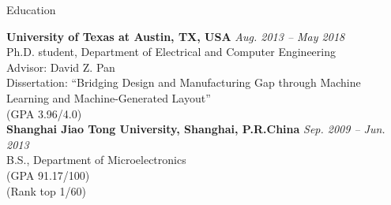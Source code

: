

\begin{rSection}{Education}


{\bf University of Texas at Austin, TX, USA} \hfill {\em Aug. 2013 -- May 2018} \\ 
Ph.D. student, Department of Electrical and Computer Engineering \\
Advisor: David Z. Pan \\
Dissertation: ``Bridging Design and Manufacturing Gap through Machine Learning and Machine-Generated Layout'' \\
(GPA 3.96/4.0) \\

{\bf Shanghai Jiao Tong University, Shanghai, P.R.China} \hfill {\em Sep. 2009 -- Jun. 2013} \\ 
B.S., Department of Microelectronics \\
(GPA 91.17/100) \\
(Rank top 1/60)

\end{rSection}

